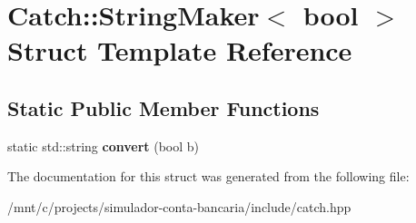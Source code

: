 \hypertarget{structCatch_1_1StringMaker_3_01bool_01_4}{}\section{Catch\+:\+:String\+Maker$<$ bool $>$ Struct Template Reference}
\label{structCatch_1_1StringMaker_3_01bool_01_4}
\subsection*{Static Public Member Functions}
\begin{DoxyCompactItemize}
\item 
\mbox{\label{structCatch_1_1StringMaker_3_01bool_01_4_a37e9899c82c4b4515f876f16f8957a77}} 
static std\+::string {\bfseries convert} (bool b)
\end{DoxyCompactItemize}


The documentation for this struct was generated from the following file\+:\begin{DoxyCompactItemize}
\item 
/mnt/c/projects/simulador-\/conta-\/bancaria/include/catch.\+hpp\end{DoxyCompactItemize}
